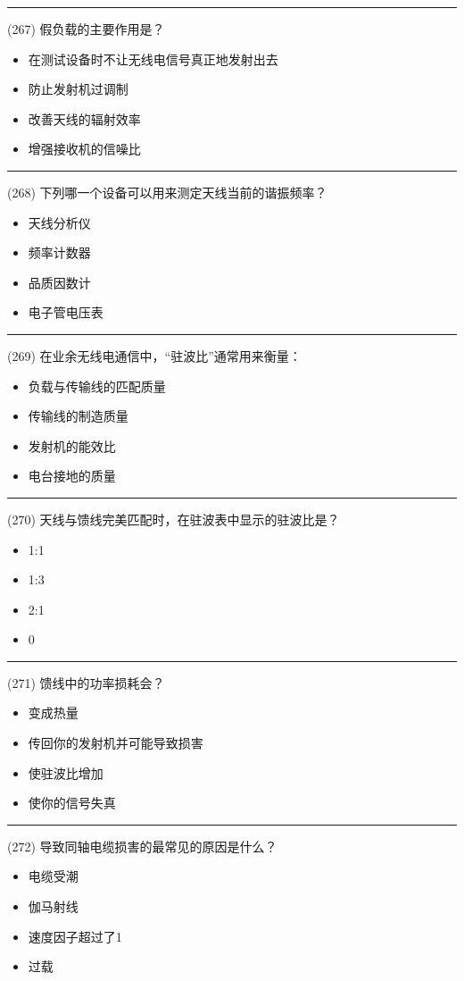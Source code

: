 \documentclass[twocolumn]{ctexart}  %
\begin{document}
\noindent\rule{0.5\textwidth}{1pt}
\heiti (267) 假负载的主要作用是？ \songti {\color{gray} [LK1183] }
\begin{itemize}
	\item  在测试设备时不让无线电信号真正地发射出去
	\item  防止发射机过调制
	\item  改善天线的辐射效率
	\item  增强接收机的信噪比
\end{itemize}


\noindent\rule{0.5\textwidth}{1pt}
\heiti (268) 下列哪一个设备可以用来测定天线当前的谐振频率？ \songti {\color{gray} [LK1184] }
\begin{itemize}
	\item  天线分析仪
	\item  频率计数器
	\item  品质因数计
	\item  电子管电压表
\end{itemize}


\noindent\rule{0.5\textwidth}{1pt}
\heiti (269) 在业余无线电通信中，“驻波比”通常用来衡量： \songti {\color{gray} [LK1185] }
\begin{itemize}
	\item  负载与传输线的匹配质量
	\item  传输线的制造质量
	\item  发射机的能效比
	\item  电台接地的质量
\end{itemize}


\noindent\rule{0.5\textwidth}{1pt}
\heiti (270) 天线与馈线完美匹配时，在驻波表中显示的驻波比是？ \songti {\color{gray} [LK1186] }
\begin{itemize}
	\item  1:1
	\item  1:3
	\item  2:1
	\item  0
\end{itemize}


\noindent\rule{0.5\textwidth}{1pt}
\heiti (271) 馈线中的功率损耗会？ \songti {\color{gray} [LK1188] }
\begin{itemize}
	\item  变成热量
	\item  传回你的发射机并可能导致损害
	\item  使驻波比增加
	\item  使你的信号失真
\end{itemize}


\noindent\rule{0.5\textwidth}{1pt}
\heiti (272) 导致同轴电缆损害的最常见的原因是什么？ \songti {\color{gray} [LK1189] }
\begin{itemize}
	\item  电缆受潮
	\item  伽马射线
	\item  速度因子超过了1
	\item  过载
\end{itemize}
\end{document}
